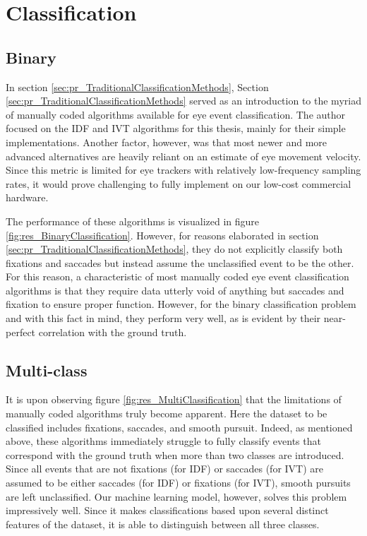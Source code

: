 \section{Classification} \label{sec:disc_Classification}


\subsection{Binary}
In section \ref{sec:pr_TraditionalClassificationMethods}, 
Section \ref{sec:pr_TraditionalClassificationMethods} served as an introduction to the myriad of manually coded algorithms available for eye event classification. The author focused on the IDF and IVT algorithms for this thesis, mainly for their simple implementations. Another factor, however, was that most newer and more advanced alternatives are heavily reliant on an estimate of eye movement velocity. Since this metric is limited for eye trackers with relatively low-frequency sampling rates, it would prove challenging to fully implement on our low-cost commercial hardware. 

The performance of these algorithms is visualized in figure \ref{fig:res_BinaryClassification}. However, for reasons elaborated in section \ref{sec:pr_TraditionalClassificationMethods}, they do not explicitly classify both fixations and saccades but instead assume the unclassified event to be the other. For this reason, a characteristic of most manually coded eye event classification algorithms is that they require data utterly void of anything but saccades and fixation to ensure proper function. However, for the binary classification problem and with this fact in mind, they perform very well, as is evident by their near-perfect correlation with the ground truth.

\subsection{Multi-class}

It is upon observing figure \ref{fig:res_MultiClassification} that the limitations of manually coded algorithms truly become apparent. Here the dataset to be classified includes fixations, saccades, and smooth pursuit. Indeed, as mentioned above, these algorithms immediately struggle to fully classify events that correspond with the ground truth when more than two classes are introduced. Since all events that are not fixations (for IDF) or saccades (for IVT) are assumed to be either saccades (for IDF) or fixations (for IVT), smooth pursuits are left unclassified. Our machine learning model, however, solves this problem impressively well. Since it makes classifications based upon several distinct features of the dataset, it is able to distinguish between all three classes.

